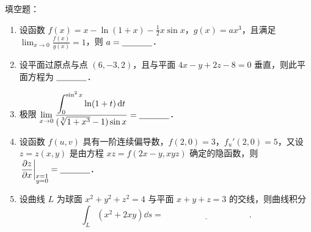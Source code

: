 
填空题：
\begin{enumerate}[label=(\arabic*)]
  \item 设函数 $f(x)=x-\ln(1+x)-\frac{1}{2}x\sin x$，$g(x)=ax^3$，且满足 $\displaystyle \lim_{x\to 0}\frac{f(x)}{g(x)}=1$，则 $a=\underline{\hspace{3.5em}}$．
  \item 设平面过原点与点 $(6,-3,2)$，且与平面 $4x-y+2z-8=0$ 垂直，则此平面方程为 $\underline{\hspace{3.5em}}$．
  \item 极限 $\displaystyle \lim_{x\to 0}\frac{\displaystyle \int_0^{\sin^2 x}\ln(1+t)\,\mathrm{d} t}{(\sqrt[3]{1+x^3}-1)\sin x}=\underline{\hspace{3.5em}}$．
  \item 设函数 $f(u,v)$ 具有一阶连续偏导数，$f(2,0)=3$，$f_u'(2,0)=5$，又设 $z=z(x,y)$ 是由方程 $xz=f(2x-y,xyz)$ 确定的隐函数，则 $\displaystyle \left.\frac{\partial z}{\partial x}\right|_{\substack{x=1\\ y=0}}=\underline{\hspace{3.5em}}$．
  \item 设曲线 $L$ 为球面 $x^2+y^2+z^2=4$ 与平面 $x+y+z=3$ 的交线，则曲线积分
  \[
    \int_L (x^2+2xy)\dd s=\underline{\hspace{10em}}.
  \]
\end{enumerate}
